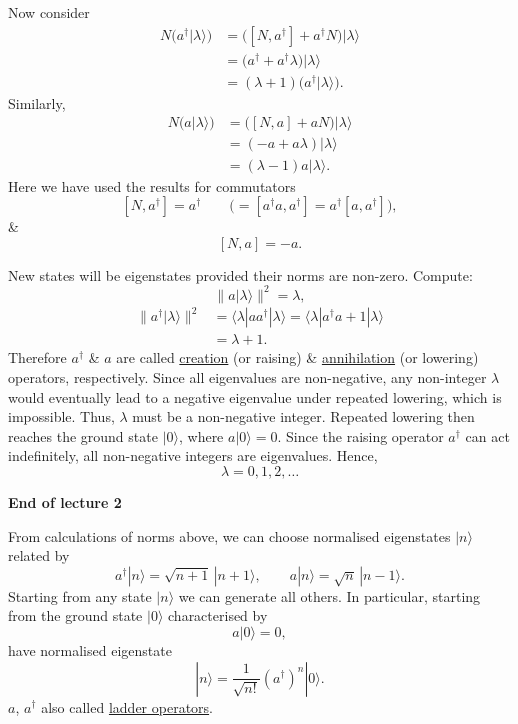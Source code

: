 \documentclass[11pt,a4paper]{article}
\begin{document}
Now consider
\begin{align*}
    N\bigl(a^\dagger|\lambda\rangle\bigr)
    &=\bigl([N,a^\dagger]+a^\dagger N\bigr)|\lambda\rangle\\
    &=\bigl(a^\dagger+a^\dagger\lambda\bigr)|\lambda\rangle\\
    &=(\lambda+1)\bigl(a^\dagger|\lambda\rangle\bigr).
\end{align*}
Similarly,
\begin{align*}
    N\bigl(a|\lambda\rangle\bigr)
    &=\bigl([N,a]+aN\bigr)|\lambda\rangle\\
    &=(-a+a\lambda)|\lambda\rangle\\
    &=(\lambda-1)a|\lambda\rangle.
\end{align*}
Here we have used the results for commutators
\[
    [N,a^\dagger]=a^\dagger
    \qquad
    \bigl(=[a^\dagger a,a^\dagger]
    =a^\dagger[a,a^\dagger]\bigr),
\]
\&
\[
    [N,a]=-a.
\]

New states will be eigenstates provided their norms are non-zero.
Compute:
\[
    \bigl\|a|\lambda\rangle\bigr\|^2=\lambda,
\]
\begin{align*}
    \bigl\|a^\dagger|\lambda\rangle\bigr\|^2
    &=\langle\lambda|aa^\dagger|\lambda\rangle
    =\langle\lambda|a^\dagger a+1|\lambda\rangle\\
    &=\lambda+1.
\end{align*}
Therefore $a^\dagger$ \& $a$ are called
\underline{creation} (or raising) \&
\underline{annihilation} (or lowering) operators, respectively.
Since all eigenvalues are non-negative, any non-integer
$\lambda$ would eventually lead to a negative eigenvalue
under repeated lowering, which is impossible.
Thus, $\lambda$ must be a non-negative integer.
Repeated lowering then reaches the ground state
$|0\rangle$, where $a|0\rangle=0$.
Since the raising operator $a^\dagger$ can act indefinitely,
all non-negative integers are eigenvalues. Hence,
\[
\boxed{\lambda=0,1,2,\ldots}
\]
\begin{center}
    \textbf{End of lecture 2}
\end{center}

From calculations of norms above, we can choose normalised eigenstates
$|n\rangle$ related by
\[
    a^\dagger|n\rangle=\sqrt{n+1}\,|n+1\rangle,
    \qquad
    a|n\rangle=\sqrt{n}\,|n-1\rangle.
\]
Starting from any state $|n\rangle$ we can generate all others.
In particular, starting from the ground state $|0\rangle$ characterised by
\[
    a|0\rangle=0,
\]
have normalised eigenstate
\[
    |n\rangle=\frac{1}{\sqrt{n!}}(a^\dagger)^n|0\rangle.
\]
$a$, $a^\dagger$ also called \underline{ladder operators}.
\end{document}
